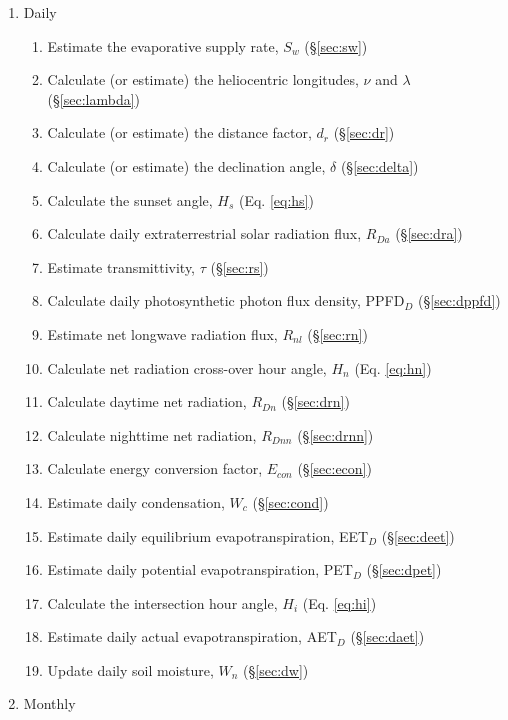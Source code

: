 \begin{enumerate}
	\item Daily
	\begin{enumerate}
		\item Estimate the evaporative supply rate, $S_w$ (\S \ref{sec:sw})
		\item Calculate (or estimate) the heliocentric longitudes, 
		      $\nu$ and $\lambda$ (\S \ref{sec:lambda})
		\item Calculate (or estimate) the distance factor, $d_r$ 
		      (\S \ref{sec:dr})
		\item Calculate (or estimate) the declination angle, $\delta$ 
		      (\S \ref{sec:delta})
		\item Calculate the sunset angle, $H_s$ (Eq. \ref{eq:hs})
		\item Calculate daily extraterrestrial solar radiation flux, $R_{Da}$ 
		      (\S \ref{sec:dra})
		\item Estimate transmittivity, $\tau$ (\S \ref{sec:rs})
		\item Calculate daily photosynthetic photon flux density, PPFD$_D$ 
		      (\S \ref{sec:dppfd})
		\item Estimate net longwave radiation flux, $R_{nl}$ (\S \ref{sec:rn})
		\item Calculate net radiation cross-over hour angle, $H_n$ 
		      (Eq. \ref{eq:hn})
		\item Calculate daytime net radiation, $R_{Dn}$ (\S \ref{sec:drn})
		\item Calculate nighttime net radiation, $R_{Dnn}$ (\S \ref{sec:drnn})
		\item Calculate energy conversion factor, $E_{con}$ (\S \ref{sec:econ})
		\item Estimate daily condensation, $W_c$ (\S \ref{sec:cond})
		\item Estimate daily equilibrium evapotranspiration, EET$_D$ 
		      (\S \ref{sec:deet})
		\item Estimate daily potential evapotranspiration, PET$_D$ 
		      (\S \ref{sec:dpet})
		\item Calculate the intersection hour angle, $H_i$ (Eq. \ref{eq:hi})
		\item Estimate daily actual evapotranspiration, AET$_D$ 
		      (\S \ref{sec:daet})
		\item Update daily soil moisture, $W_n$ (\S \ref{sec:dw})
	\end{enumerate}
	\item Monthly
	\begin{enumerate}

\end{enumerate}
\end{enumerate}
